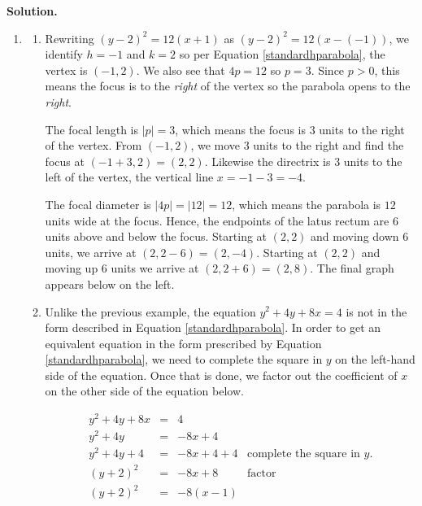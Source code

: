 \begin{ex}
\begin{enumerate}
\begin{enumerate}
\begin{center}
\end{center}

\end{enumerate}


\end{enumerate}

\medskip

{\bf Solution.} 


\begin{enumerate}

\item

\begin{enumerate}

\item  Rewriting $(y-2)^2 = 12(x+1)$ as $(y-2)^2 = 12(x-(-1))$, we identify $h=-1$ and $k=2$ so per  Equation \ref{standardhparabola}, the vertex is $(-1,2)$.  We also see that $4p = 12$ so $p = 3$.  Since $p>0$, this means the focus is to the \textit{right} of the vertex so the parabola opens to the \textit{right}.


\smallskip

The focal length is $|p| = 3$, which means the focus is $3$ units to the right of the vertex.  From $(-1,2)$, we move  $3$ units to the right and find the focus at $(-1+3,2) = (2,2)$.  Likewise the directrix is $3$ units to the left of the vertex, the vertical  line $x=-1-3 = -4$.  


\smallskip

The focal diameter is $|4p| = |12| = 12$, which means the parabola is $12$ units wide at the focus.  Hence, the endpoints of the latus rectum are $6$ units above and below  the focus.  Starting at $(2,2)$ and moving down $6$ units, we arrive at $(2,2-6) = (2,-4)$.  Starting at $(2,2)$ and moving up  $6$ units we arrive at $(2,2+6) = (2,8)$.  The final graph appears below on the left.

\item  Unlike the previous example, the equation  $y^2 + 4y + 8x = 4$ is not in the form described  in Equation \ref{standardhparabola}.  In order to get an equivalent equation in the form prescribed by  Equation \ref{standardhparabola}, we need to complete the square in $y$  on the left-hand side of the equation.  Once that is done, we  factor out the coefficient of $x$ on the other side of the equation below.

\[ \begin{array}{rclr} y^2+4y+8x &  = & 4 & \\
y^2 + 4y &  = & -8x + 4 &  \\
y^2+4y+4 & = & -8x+4+4 & \mbox{complete the square in $y$.} \\
(y+2)^2 & = &-8x+8 & \mbox{factor}  \\ 
(y+2)^2 & = & -8(x-1) &   \end{array} \]


\end{enumerate}
\end{enumerate}
\end{ex}
